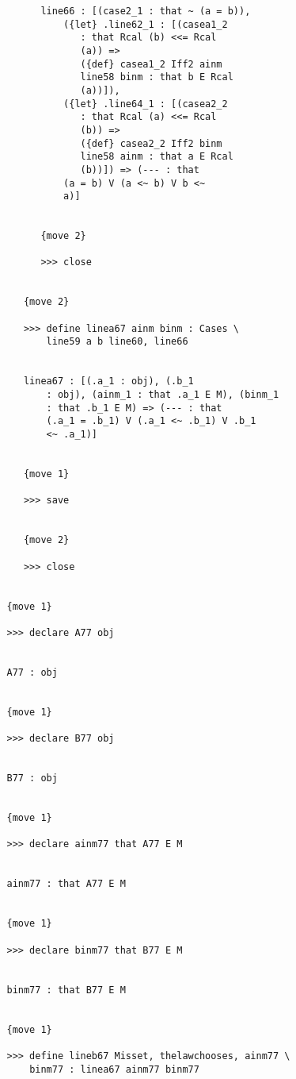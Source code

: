 \documentclass[12pt]{article}
\begin{document}
\begin{verbatim}
         line66 : [(case2_1 : that ~ (a = b)), 
             ({let} .line62_1 : [(casea1_2 
                : that Rcal (b) <<= Rcal 
                (a)) => 
                ({def} casea1_2 Iff2 ainm 
                line58 binm : that b E Rcal 
                (a))]), 
             ({let} .line64_1 : [(casea2_2 
                : that Rcal (a) <<= Rcal 
                (b)) => 
                ({def} casea2_2 Iff2 binm 
                line58 ainm : that a E Rcal 
                (b))]) => (--- : that 
             (a = b) V (a <~ b) V b <~ 
             a)]


         {move 2}

         >>> close


      {move 2}

      >>> define linea67 ainm binm : Cases \
          line59 a b line60, line66


      linea67 : [(.a_1 : obj), (.b_1 
          : obj), (ainm_1 : that .a_1 E M), (binm_1 
          : that .b_1 E M) => (--- : that 
          (.a_1 = .b_1) V (.a_1 <~ .b_1) V .b_1 
          <~ .a_1)]


      {move 1}

      >>> save


      {move 2}

      >>> close


   {move 1}

   >>> declare A77 obj


   A77 : obj


   {move 1}

   >>> declare B77 obj


   B77 : obj


   {move 1}

   >>> declare ainm77 that A77 E M


   ainm77 : that A77 E M


   {move 1}

   >>> declare binm77 that B77 E M


   binm77 : that B77 E M


   {move 1}

   >>> define lineb67 Misset, thelawchooses, ainm77 \
       binm77 : linea67 ainm77 binm77



\end{verbatim}
\end{document}
